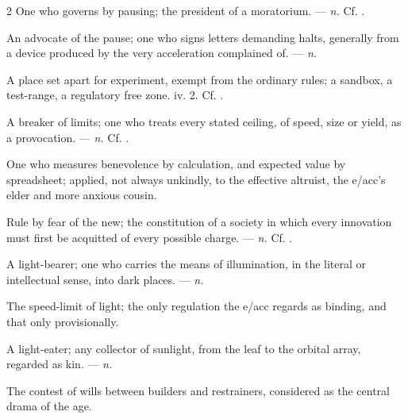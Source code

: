 \begin{multicols}{2}
 One who governs by pausing; the president of a moratorium.   —  \textit{n.} Cf. .

 An advocate of the pause; one who signs letters demanding halts, generally from a device produced by the very acceleration complained of. —  \textit{n.}

 A place set apart for experiment, exempt from the ordinary rules; a sandbox, a test-range, a regulatory free zone.   iv. 2. Cf. .

 A breaker of limits; one who treats every stated ceiling, of speed, size or yield, as a provocation. —  \textit{n.} Cf. .

 One who measures benevolence by calculation, and expected value by spreadsheet; applied, not always unkindly, to the effective altruist, the e/acc's elder and more anxious cousin.

 Rule by fear of the new; the constitution of a society in which every innovation must first be acquitted of every possible charge. —  \textit{n.} Cf. .

 A light-bearer; one who carries the means of illumination, in the literal or intellectual sense, into dark places. —  \textit{n.}

 The speed-limit of light; the only regulation the e/acc regards as binding, and that only provisionally.

 A light-eater; any collector of sunlight, from the leaf to the orbital array, regarded as kin.  —  \textit{n.}

 The contest of wills between builders and restrainers, considered as the central drama of the age.


\end{multicols}
